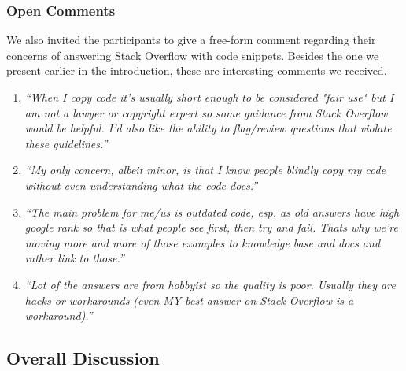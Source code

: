 \documentclass[10pt,journal,compsoc]{IEEEtran}
\begin{document}
\subsubsection{Open Comments} We also invited the participants to give a
free-form comment regarding their concerns of answering Stack Overflow with code
snippets. Besides the one we present earlier in the introduction, these are
interesting comments we received.

\begin{enumerate}
	\item \textit{``When I copy code it's usually short enough to be considered "fair
		use" but I am not a lawyer or copyright expert so some guidance from Stack Overflow would be
		helpful. I'd also like the ability to flag/review questions that violate these
		guidelines.''}
	\item \textit{``My only concern, albeit minor, is that I know people blindly copy
		my code without even understanding what the code does.''}
	\item \textit{``The main problem for me/us is outdated code, esp. as old answers
		have high google rank so that is what people see first, then try and fail. Thats
		why we're moving more and more of those examples to knowledge base and docs and
		rather link to those.''}
	\item \textit{``Lot of the answers are from hobbyist so the quality is poor.
		Usually they are hacks or workarounds (even MY best answer on Stack Overflow is a
		workaround).''}
\end{enumerate}

\subsection{Overall Discussion} %
\end{document}
